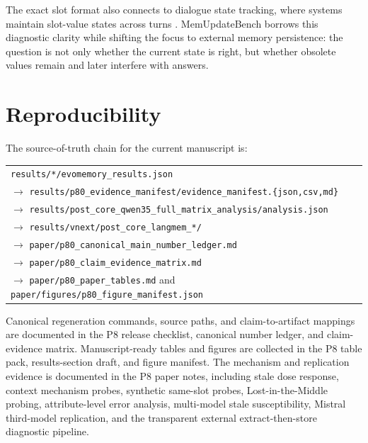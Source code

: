 \documentclass[11pt]{article}
\begin{document}
The exact slot format also connects to dialogue state tracking, where systems maintain slot-value states across turns \citep{dialogue_state_tracking}. MemUpdateBench borrows this diagnostic clarity while shifting the focus to external memory persistence: the question is not only whether the current state is right, but whether obsolete values remain and later interfere with answers.

\section{Reproducibility}

The source-of-truth chain for the current manuscript is:
\begin{center}
\small
\begin{tabular}{l}
\texttt{results/*/evomemory\_results.json} \\
\(\rightarrow\) \texttt{results/p80\_evidence\_manifest/evidence\_manifest.\{json,csv,md\}} \\
\(\rightarrow\) \texttt{results/post\_core\_qwen35\_full\_matrix\_analysis/analysis.json} \\
\(\rightarrow\) \texttt{results/vnext/post\_core\_langmem\_*/} \\
\(\rightarrow\) \texttt{paper/p80\_canonical\_main\_number\_ledger.md} \\
\(\rightarrow\) \texttt{paper/p80\_claim\_evidence\_matrix.md} \\
\(\rightarrow\) \texttt{paper/p80\_paper\_tables.md} and \texttt{paper/figures/p80\_figure\_manifest.json}
\end{tabular}
\end{center}

Canonical regeneration commands, source paths, and claim-to-artifact mappings are documented in the P8 release checklist, canonical number ledger, and claim-evidence matrix. Manuscript-ready tables and figures are collected in the P8 table pack, results-section draft, and figure manifest. The mechanism and replication evidence is documented in the P8 paper notes, including stale dose response, context mechanism probes, synthetic same-slot probes, Lost-in-the-Middle probing, attribute-level error analysis, multi-model stale susceptibility, Mistral third-model replication, and the transparent external extract-then-store diagnostic pipeline.



\end{document}
